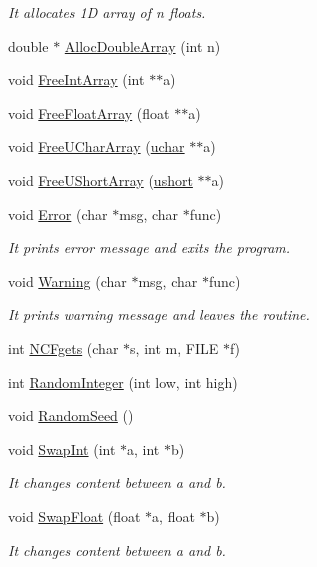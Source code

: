 \begin{DoxyCompactItemize}
\begin{DoxyCompactList}\small\item\em It allocates 1\-D array of n floats. \end{DoxyCompactList}\item 
double $\ast$ \hyperlink{namespacegft_a7453f28bdf7db9da89f2da7844195889}{Alloc\-Double\-Array} (int n)
\item 
void \hyperlink{namespacegft_a0f2a6bffb189beb38a7bcdc962a0a2c5}{Free\-Int\-Array} (int $\ast$$\ast$a)
\item 
void \hyperlink{namespacegft_a5ec687d5e4384d55db997b3a66b852e7}{Free\-Float\-Array} (float $\ast$$\ast$a)
\item 
void \hyperlink{namespacegft_abaf22a3821bbe3380cfd60ae79996c27}{Free\-U\-Char\-Array} (\hyperlink{namespacegft_a6411e297d5ac5aa9b91a37da00952197}{uchar} $\ast$$\ast$a)
\item 
void \hyperlink{namespacegft_aecdfb988241698a836ad3e2977b962cb}{Free\-U\-Short\-Array} (\hyperlink{namespacegft_a878518cf75338c097e2c8e9b10bfb00d}{ushort} $\ast$$\ast$a)
\item 
void \hyperlink{namespacegft_a050094eb54bca97db90240d02835595c}{Error} (char $\ast$msg, char $\ast$func)
\begin{DoxyCompactList}\small\item\em It prints error message and exits the program. \end{DoxyCompactList}\item 
void \hyperlink{namespacegft_af1dd4eab5a649fc5a6b9d2c180bfca8c}{Warning} (char $\ast$msg, char $\ast$func)
\begin{DoxyCompactList}\small\item\em It prints warning message and leaves the routine. \end{DoxyCompactList}\item 
int \hyperlink{namespacegft_acb616184b19a85d20c201ddee209e954}{N\-C\-Fgets} (char $\ast$s, int m, F\-I\-L\-E $\ast$f)
\item 
int \hyperlink{namespacegft_a9523e27c2d0a7b2186f024d9cd218a04}{Random\-Integer} (int low, int high)
\item 
void \hyperlink{namespacegft_ae6903c75090e0a316cae6f37ade10cf2}{Random\-Seed} ()
\item 
void \hyperlink{namespacegft_a51ce532a81292eb9a58459c4acafd8ca}{Swap\-Int} (int $\ast$a, int $\ast$b)
\begin{DoxyCompactList}\small\item\em It changes content between a and b. \end{DoxyCompactList}\item 
void \hyperlink{namespacegft_aa39bacf88e058b9f282868abec0a73f7}{Swap\-Float} (float $\ast$a, float $\ast$b)
\begin{DoxyCompactList}\small\item\em It changes content between a and b. \end{DoxyCompactList}\end{DoxyCompactItemize}


